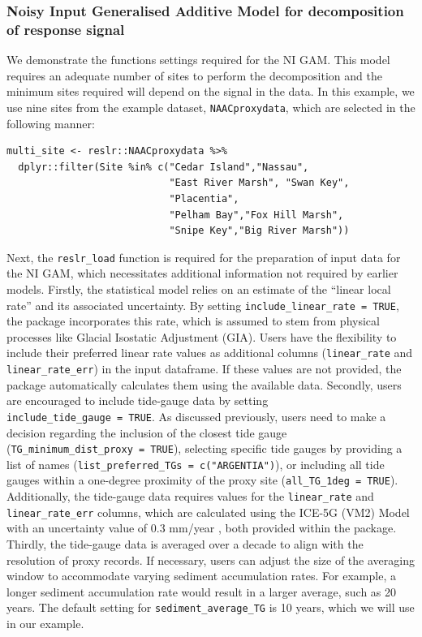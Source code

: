 \subsubsection{Noisy Input Generalised Additive Model for decomposition of response signal}\label{casestudy2nigam}
We demonstrate the functions settings required for the NI GAM. This model requires an adequate number of sites to perform the decomposition and the minimum sites required will depend on the signal in the data. In this example, we use nine sites from the example dataset, \texttt{NAACproxydata}, which are selected in the following manner:
\scriptsize
\begin{verbatim}
multi_site <- reslr::NAACproxydata %>% 
  dplyr::filter(Site %in% c("Cedar Island","Nassau",
                            "East River Marsh", "Swan Key",
                            "Placentia",
                            "Pelham Bay","Fox Hill Marsh",
                            "Snipe Key","Big River Marsh"))
\end{verbatim}
\normalsize
Next, the \texttt{reslr\_load} function is required for the preparation of input data for the NI GAM, which necessitates additional information not required by earlier models. Firstly, the statistical model relies on an estimate of the ``linear local rate'' and its associated uncertainty. By setting \texttt{include\_linear\_rate\ =\ TRUE}, the package incorporates this rate, which is assumed to stem from physical processes like Glacial Isostatic Adjustment (GIA). Users have the flexibility to include their preferred linear rate values as additional columns (\texttt{linear\_rate} and \texttt{linear\_rate\_err}) in the input dataframe. If these values are not provided, the package automatically calculates them using the available data.
Secondly, users are encouraged to include tide-gauge data by setting \texttt{include\_tide\_gauge\ =\ TRUE}. As discussed previously, users need to make a decision regarding the inclusion of the closest tide gauge (\texttt{TG\_minimum\_dist\_proxy\ =\ TRUE}), selecting specific tide gauges by providing a list of names (\texttt{list\_preferred\_TGs\ =\ c("ARGENTIA")}), or including all tide gauges within a one-degree proximity of the proxy site (\texttt{all\_TG\_1deg\ =\ TRUE}). Additionally, the tide-gauge data requires values for the \texttt{linear\_rate} and \texttt{linear\_rate\_err} columns, which are calculated using the ICE-5G (VM2) Model \citep{Peltier2004} with an uncertainty value of 0.3 mm/year \citep{Engelhart2009}, both provided within the  package.
Thirdly, the tide-gauge data is averaged over a decade to align with the resolution of proxy records. If necessary, users can adjust the size of the averaging window to accommodate varying sediment accumulation rates. For example, a longer sediment accumulation rate would result in a larger average, such as 20 years. The default setting for \texttt{sediment\_average\_TG} is 10 years, which we will use in our example.
